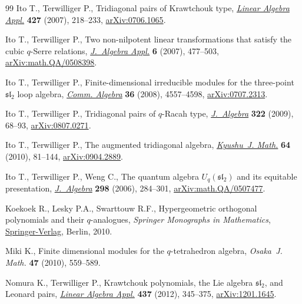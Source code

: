 \documentclass[pdftex]{sigma}
\numberwithin{equation}{section}
\begin{document}
\begin{thebibliography}{99}
Ito T., Terwilliger P., Tridiagonal pairs of {K}rawtchouk type, \href{https://doi.org/10.1016/j.laa.2007.07.014}{\textit{Linear
 Algebra Appl.}} \textbf{427} (2007), 218--233, \href{https://arxiv.org/abs/0706.1065}{arXiv:0706.1065}.

Ito T., Terwilliger P., Two non-nilpotent linear transformations that satisfy
 the cubic {$q$}-{S}erre relations, \href{https://doi.org/10.1142/S021949880700234X}{\textit{J.~Algebra Appl.}} \textbf{6}
 (2007), 477--503, \href{https://arxiv.org/abs/math.QA/0508398}{arXiv:math.QA/0508398}.

Ito T., Terwilliger P., Finite-dimensional irreducible modules for the
 three-point {$\mathfrak{sl}_2$} loop algebra, \href{https://doi.org/10.1080/00927870802185963}{\textit{Comm. Algebra}}
 \textbf{36} (2008), 4557--4598, \href{https://arxiv.org/abs/0707.2313}{arXiv:0707.2313}.

Ito T., Terwilliger P., Tridiagonal pairs of {$q$}-{R}acah type,
 \href{https://doi.org/10.1016/j.jalgebra.2009.04.008}{\textit{J.~Algebra}} \textbf{322} (2009), 68--93, \href{https://arxiv.org/abs/0807.0271}{arXiv:0807.0271}.

Ito T., Terwilliger P., The augmented tridiagonal algebra, \href{https://doi.org/10.2206/kyushujm.64.81}{\textit{Kyushu~J.
 Math.}} \textbf{64} (2010), 81--144, \href{https://arxiv.org/abs/0904.2889}{arXiv:0904.2889}.

Ito T., Terwilliger P., Weng C., The quantum algebra {$U_q(\mathfrak{sl}_2)$}
 and its equitable presentation, \href{https://doi.org/10.1016/j.jalgebra.2005.07.038}{\textit{J.~Algebra}} \textbf{298} (2006),
 284--301, \href{https://arxiv.org/abs/math.QA/0507477}{arXiv:math.QA/0507477}.

Koekoek R., Lesky P.A., Swarttouw R.F., Hypergeometric orthogonal polynomials
 and their {$q$}-analogues, \textit{Springer Monographs in Mathematics},
 \href{https://doi.org/10.1007/978-3-642-05014-5}{Springer-Verlag}, Berlin, 2010.

Miki K., Finite dimensional modules for the {$q$}-tetrahedron algebra,
 \textit{Osaka~J. Math.} \textbf{47} (2010), 559--589.

Nomura K., Terwilliger P., Krawtchouk polynomials, the {L}ie algebra
 {$\mathfrak{sl}_2$}, and {L}eonard pairs, \href{https://doi.org/10.1016/j.laa.2012.02.006}{\textit{Linear Algebra Appl.}}
 \textbf{437} (2012), 345--375, \href{https://arxiv.org/abs/1201.1645}{arXiv:1201.1645}.


\end{thebibliography}
\end{document}
